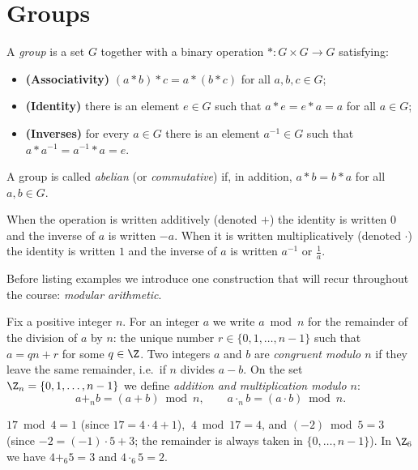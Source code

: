 \section{Groups}

\begin{definition}
A \emph{group} is a set $G$ together with a binary operation $*\colon G\times G\to G$ satisfying:
\begin{itemize}
\item \textbf{(Associativity)} $(a*b)*c = a*(b*c)$ for all $a,b,c\in G$;
\item \textbf{(Identity)} there is an element $e\in G$ such that $a*e=e*a=a$ for all $a\in G$;
\item \textbf{(Inverses)} for every $a\in G$ there is an element $a^{-1}\in G$ such that
$a*a^{-1}=a^{-1}*a=e$.
\end{itemize}
A group is called \emph{abelian} (or \emph{commutative}) if, in addition, $a*b=b*a$ for all $a,b\in G$.
\end{definition}

\begin{remark}
When the operation is written additively (denoted $+$) the identity is written $0$ and the inverse of $a$ is
written $-a$. When it is written multiplicatively (denoted $\cdot$) the identity is written $1$ and the
inverse of $a$ is written $a^{-1}$ or $\tfrac{1}{a}$.
\end{remark}

Before listing examples we introduce one construction that will recur throughout the course:
\emph{modular arithmetic}.

\begin{definition}
Fix a positive integer $n$. For an integer $a$ we write $a \bmod n$ for the remainder of the division of
$a$ by $n$: the unique number $r\in\{0,1,\ldots,n-1\}$ such that $a = qn + r$ for some $q\in\Z$. Two
integers $a$ and $b$ are \emph{congruent modulo $n$} if they leave the same remainder, i.e.\ if $n$
divides $a-b$. On the set $\Z_n = \{0,1,\ldots,n-1\}$ we define \emph{addition and multiplication modulo
$n$}:
\[
a +_n b = (a+b) \bmod n, \qquad a \cdot_n b = (a\cdot b) \bmod n.
\]
\end{definition}

\begin{example}
$17 \bmod 4 = 1$ (since $17 = 4\cdot 4+1$), $\ 4 \bmod 17 = 4$, and $(-2)\bmod 5 = 3$ (since
$-2 = (-1)\cdot 5 + 3$; the remainder is always taken in $\{0,\ldots,n-1\}$). In $\Z_6$ we have
$4 +_6 5 = 3$ and $4 \cdot_6 5 = 2$.
\end{example}

